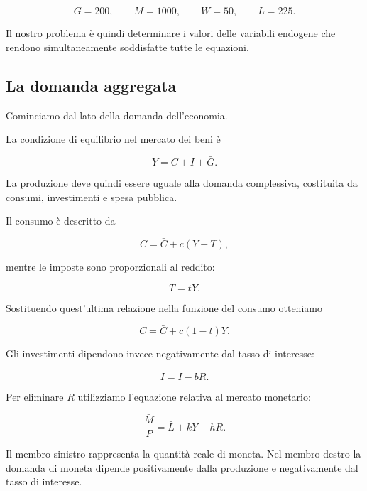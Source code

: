 \begin{equation*}
\bar{G}=200,\qquad
\bar{M}=1000,\qquad
\bar{W}=50,\qquad
\bar{L}=225.
\end{equation*}

Il nostro problema è quindi determinare i valori delle variabili
endogene che rendono simultaneamente soddisfatte tutte le equazioni.


\subsection{La domanda aggregata}

Cominciamo dal lato della domanda dell'economia.

La condizione di equilibrio nel mercato dei beni è

\begin{equation*}
    Y=C+I+\bar{G}.
\end{equation*}

La produzione deve quindi essere uguale alla domanda complessiva,
costituita da consumi, investimenti e spesa pubblica.

Il consumo è descritto da

\begin{equation*}
    C=\bar{C}+c(Y-T),
\end{equation*}

mentre le imposte sono proporzionali al reddito:

\begin{equation*}
    T=tY.
\end{equation*}

Sostituendo quest'ultima relazione nella funzione del consumo
otteniamo

\begin{equation*}
    C=\bar{C}+c(1-t)Y.
    \label{eq:adas_consumption_reduced}
\end{equation*}

Gli investimenti dipendono invece negativamente dal tasso di
interesse:

\begin{equation*}
    I=\bar{I}-bR.
\end{equation*}

Per eliminare $R$ utilizziamo l'equazione relativa al mercato
monetario:

\begin{equation*}
    \frac{\bar{M}}{P}
    =
    \bar{L}+kY-hR.
\end{equation*}

Il membro sinistro rappresenta la quantità reale di moneta. Nel
membro destro la domanda di moneta dipende positivamente dalla
produzione e negativamente dal tasso di interesse.

